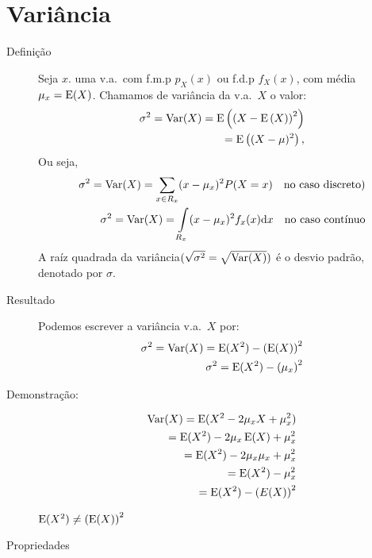        \section{Variância}

       \begin{description}
         \item [Definição] Seja $x.$ uma v.a.\ com f.m.p $p_{X}(x)$ ou f.d.p $f_{X}(x)$, com 
           média $\mu_{x}=\operatorname{E}(X)$. Chamamos de variância da v.a.\ $X$ o valor: 
           \begin{align}
             \sigma^2=\operatorname{Var}(X)=\operatorname{E}\left(\left(X-\operatorname{E}\left(X\right)\right)^2\right)\\
             =\operatorname{E} \left((X-\mu)^2\right),
           \end{align}
           Ou seja,
           \begin{align}
             \sigma^2 =\operatorname{Var}(X)=\sum \limits_{x \in R_{x}} (x-\mu_{x})^2 P(X=x) \text{\quad no caso discreto)}\\
               \sigma^2 =\operatorname{Var}(X)=\int \limits_{R_{x}} (x-\mu_{x})^2 f_{x}(x)\mathrm{d}x \text{\quad no caso contínuo}
             \end{align}
             A raíz quadrada da variância$(\sqrt{\sigma^2}=\sqrt{\operatorname{Var}(X)})$ é o desvio padrão, 
             denotado por $\sigma$.

           \item [Resultado] Podemos escrever a variância v.a.\ $X$ por: 
             \begin{align}
               \sigma^2 =\operatorname{Var}(X)=\operatorname{E}(X^2)-\left(\operatorname{E}(X)\right)^2\\
               \sigma^2 =\operatorname{E}(X^2)-\left(\mu_x\right)^2
             \end{align}
           \item [Demonstração:] 
             \begin{align}
               \operatorname{Var}(X)=\operatorname{E}(X^2-2\mu_{x}X+\mu_{x}^2)\\
               =\operatorname{E}(X^2)-2\mu_{x}\operatorname{E}(X)+\mu_{x}^2\\
               =\operatorname{E}(X^2)-2\mu_{x}\mu_{x}+\mu_{x}^2\\
               =\operatorname{E}(X^2)-\mu_{x}^2\\
               =\operatorname{E}(X^2)-\left(E(X)\right)^2
             \end{align}
            \begin{obs}$\operatorname{E}(X^2) \neq \left(\operatorname{E}(X)\right)^2$\end{obs}

           \item [Propriedades]


\end{description}
